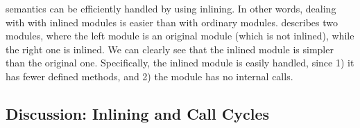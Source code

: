 \Step{} semantics can be efficiently handled by using inlining. In
other words, dealing with \Step{} with inlined modules is easier than
with ordinary modules.  describes two
modules, where the left module is an original module (which is not
inlined), while the right one is inlined. We can clearly see that the
inlined module is simpler than the original one. Specifically, the
inlined module is easily handled, since 1) it has fewer defined
methods, and 2) the module has no internal calls.

\subsection{Discussion: Inlining and Call Cycles}

\todo{}

